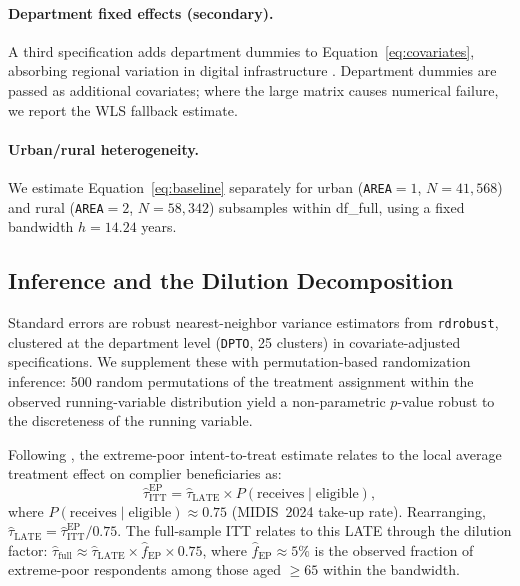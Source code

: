 \documentclass[12pt]{article}
\begin{document}
\paragraph{Department fixed effects (secondary).}
A third specification adds department dummies to
Equation~\ref{eq:covariates}, absorbing regional variation in digital
infrastructure \citep{suhrcke2024}. Department dummies are passed as
additional covariates; where the large matrix causes numerical failure,
we report the WLS fallback estimate.

\paragraph{Urban/rural heterogeneity.}
We estimate Equation~\ref{eq:baseline} separately for urban
(\texttt{AREA}$=1$, $N=41{,}568$) and rural (\texttt{AREA}$=2$, $N=58{,}342$)
subsamples within df\_full, using a fixed bandwidth $h=14.24$ years.

\subsection{Inference and the Dilution Decomposition}
\label{subsec:dilution_theory}

Standard errors are robust nearest-neighbor variance estimators from
\texttt{rdrobust}, clustered at the department level (\texttt{DPTO}, 25
clusters) in covariate-adjusted specifications. We supplement these with
permutation-based randomization inference: 500 random permutations of the
treatment assignment within the observed running-variable distribution yield
a non-parametric $p$-value robust to the discreteness of the running
variable.

Following \citet{angrist2009}, the extreme-poor intent-to-treat estimate
relates to the local average treatment effect on complier beneficiaries as:
\begin{equation}
\hat{\tau}_{\text{ITT}}^{\text{EP}}
= \hat{\tau}_{\text{LATE}} \times P(\text{receives} \mid \text{eligible}),
\label{eq:late}
\end{equation}
where $P(\text{receives} \mid \text{eligible}) \approx 0.75$ (MIDIS~2024
take-up rate). Rearranging,
$\hat{\tau}_{\text{LATE}} = \hat{\tau}_{\text{ITT}}^{\text{EP}} / 0.75$.
The full-sample ITT relates to this LATE through the dilution factor:
$\hat{\tau}_{\text{full}} \approx \hat{\tau}_{\text{LATE}} \times
\hat{f}_{\text{EP}} \times 0.75$,
where $\hat{f}_{\text{EP}} \approx 5\%$ is the observed fraction of
extreme-poor respondents among those aged $\ge 65$ within the bandwidth.
\end{document}
